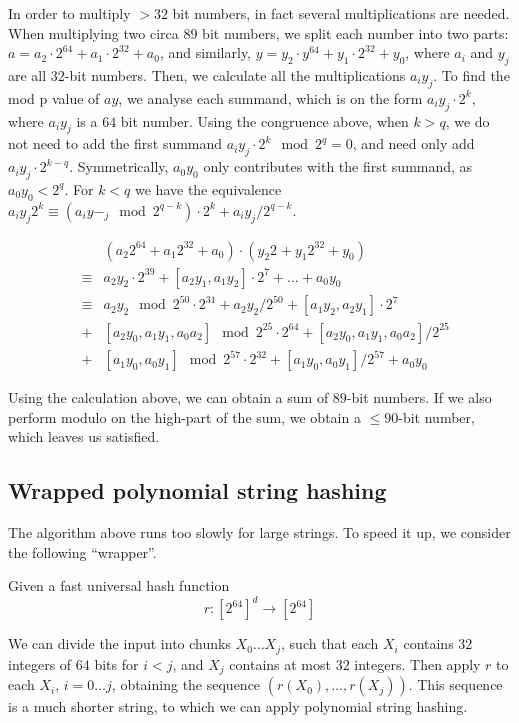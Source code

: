 \documentclass[]{article}
\begin{document}
In order to multiply $>32$ bit numbers, in fact several multiplications are needed. When multiplying two circa $89$ bit numbers, we split each number into two parts: $a = a_2\cdot 2^{64} + a_1 \cdot 2^{32} + a_0$, and similarly, $y = y_2\cdot y^{64} + y_1 \cdot 2^{32} + y_0$, where $a_i$ and $y_j$ are all $32$-bit numbers. Then, we calculate all the multiplications $a_i y_j$. To find the mod p value of $ay$, we analyse each summand, which is on the form $a_i y_j \cdot 2^{k}$, where $a_i y_j$ is a $64$ bit number. Using the congruence above, when $k>q$, we do not need to add the first summand $a_i y_j \cdot 2^k \mod 2^q = 0$, and need only add $a_i y_j \cdot 2^{k-q}$. Symmetrically, $a_0 y_0$ only contributes with the first summand, as $a_0 y_0 < 2^q$. For $k<q$ we have the equivalence $a_i y_j 2^k \equiv (a_i y-_j \mod 2^{q-k})\cdot 2^k + a_i y_j / 2^{q-k}$.

\[\begin{matrix}
& & (a_2 2^{64} + a_1 2^{32} + a_0)\cdot (y_2 2^{} + y_1 2^{32} + y_0) \\
& \equiv & a_2 y_2 \cdot 2^{39} + [a_2 y_1,a_1 y_2] \cdot 2^7 + \ldots + a_0 y_0 \\
& \equiv & a_2 y_2 \mod 2^{50} \cdot 2^{31} + a_2 y_2 / 2^{50} + [a_1 y_2, a_2 y_1] \cdot 2^7 \\
& + & [a_2 y_0, a_1 y_1, a_0 a_2] \mod 2^{25} \cdot 2^{64} + [a_2 y_0, a_1 y_1, a_0 a_2] /2^{25} \\
& + & [a_1 y_0, a_0 y_1] \mod 2^{57} \cdot 2^{32} + [a_1 y_0, a_0 y_1] /2^{57} + a_0 y_0
\end{matrix}
\]

Using the calculation above, we can obtain a sum of $89$-bit numbers. If we also perform modulo on the high-part of the sum, we obtain a $\le 90$-bit number, which leaves us satisfied.

\subsection*{Wrapped polynomial string hashing}

The algorithm above runs too slowly for large strings. To speed it up, we consider the following ``wrapper''.

Given a fast universal hash function
\[r : [2^{64}]^d \to [2^{64}] \]

We can divide the input into chunks $X_0 \ldots X_j$, such that each $X_i$ contains $32$ integers of $64$ bits for $i<j$, and $X_j$ contains at most $32$ integers. Then apply $r$ to each $X_i$, $i=0\ldots j$, obtaining the sequence $\left(r(X_0), \ldots , r(X_j)\right)$. This sequence is a much shorter string, to which we can apply polynomial string hashing.
\end{document}
